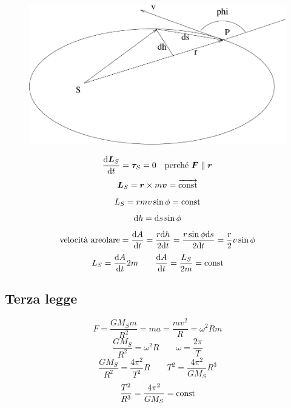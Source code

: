 \begin{figure}[htbp]
   \centering
   \includegraphics[scale=0.45]{immagini/fisica1/keplero}
\end{figure}



$$\frac{\mathrm{d}\boldsymbol{L}_S}{\mathrm{d} t}=\boldsymbol{\tau}_S=0\quad\text{perché }\boldsymbol{F}\parallel\boldsymbol{r}$$
\begin{equation*}\boldsymbol{L}_S=\boldsymbol{r}\times m\boldsymbol{v}=\overrightarrow{\text{const}}\end{equation*}
\begin{equation*}L_S=rmv\sin\phi={\text{const}}\end{equation*}
\begin{equation*}\mathrm{d} h=\mathrm{d} s\sin\phi\end{equation*}
$$\text{velocità areolare}=\frac{\mathrm{d} A}{\mathrm{d} t}=\frac{r\mathrm{d} h}{2\mathrm{d}
t}=\frac{r\sin\phi\mathrm{d} s}{2\mathrm{d} t}=\frac{r}{2}v\sin\phi$$
$$L_S=\frac{\mathrm{d} A}{\mathrm{d} t}2m\qquad\frac{\mathrm{d} A}{\mathrm{d}
t}=\frac{L_S}{2m}=\text{const}$$
\subsection{Terza legge}
\begin{equation*}F=\frac{GM_Sm}{R^2}=ma=\frac{mv^2}{R}=\omega^2Rm\end{equation*}
\begin{equation*}\frac{GM_S}{R^2}=\omega^2R\qquad \omega=\frac{2\pi}{T}\end{equation*}
$$\frac{GM_S}{R^2}=\frac{4\pi^2}{T^2}R\qquad
T^2=\frac{4\pi^2}{GM_S}R^3$$
\begin{equation*}\frac{T^2}{R^3}=\frac{4\pi^2}{GM_S}=\text{const}\end{equation*}

